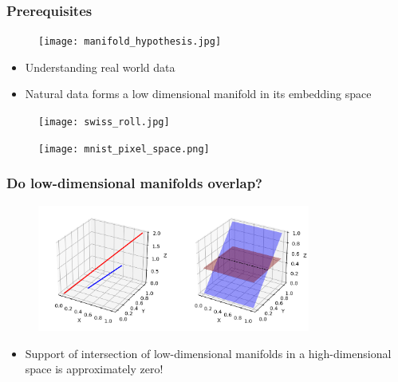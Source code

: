 \documentclass{Bredelebeamer}
\begin{document}
\begin{frame}
\frametitle{Prerequisites}
\begin{figure}[h!]
	\centering
	\texttt{[image: manifold\_hypothesis.jpg]}
\end{figure}
\begin{itemize}[<+(1)->]
	\item Understanding real world data
	\item Natural data forms a low dimensional manifold in its embedding space
\end{itemize}

\end{frame}
\begin{frame}
\begin{figure}[h!]
	\centering
	\texttt{[image: swiss\_roll.jpg]}
\end{figure}

\end{frame}
\begin{frame}
\begin{figure}[h!]
	\centering
	\texttt{[image: mnist\_pixel\_space.png]}
\end{figure}

\end{frame}
\begin{frame}
\frametitle{Do low-dimensional manifolds overlap?}
\pause
\begin{figure}[h!]
	\centering
	\includegraphics[width=0.8\textwidth]{low_dim_manifold.png}
\end{figure}
\begin{itemize}[<+(1)->]
	\item Support of intersection of low-dimensional manifolds in a high-dimensional space is approximately zero!
\end{itemize}
\end{frame}
\end{document}

